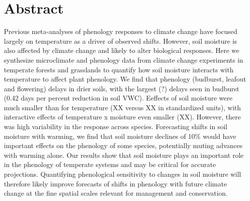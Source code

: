 \documentclass{article}
\begin{document}







\linenumbers
\section*{Abstract} %
Previous meta-analyses of phenology responses to climate change have focused largely on temperature as a driver of observed shifts. However, soil moisture is also affected by climate change and likely to alter biological responses. Here we synthesize microclimate and phenology data from climate change experiments in temperate forests and grasslands to quantify how soil moisture interacts with temperature to affect plant phenology. 
We find that phenology (budburst, leafout and flowering) delays in drier soils, with the largest (?) delays seen in budburst (0.42 days per percent reduction in soil VWC). Eeffects of soil moisture were much smaller than for temperature (XX versus XX in standardized units), with interactive effects of temperature x moisture even smaller (XX). However, there was high variability in the response across species. Forecasting shifts in soil moisture with warming, we find that soil moisture declines of 10\% would have important effects on the phenology of some species, potentially muting advances with warming alone. Our results show that soil moisture plays an important role in the phenology of temperate systems and may be critical for accurate projections. Quantifying phenological sensitivity to changes in soil moisture will therefore likely improve forecasts of shifts in phenology with future climate change at the fine spatial scales relevant for management and conservation.


\newpage
\end{document}
